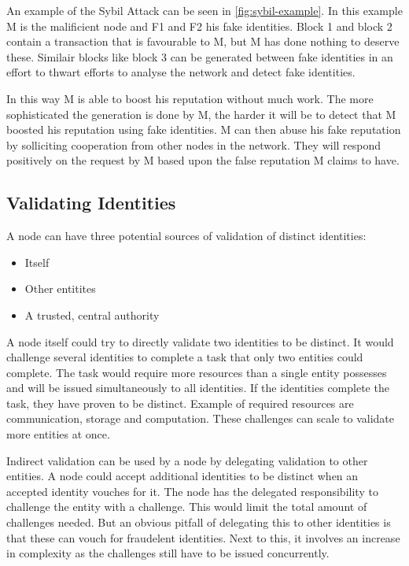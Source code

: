 An example of the Sybil Attack can be seen in \ref{fig:sybil-example}.
In this example M is the malificient node and F1 and F2 his fake identities.
Block 1 and block 2 contain a transaction that is favourable to M,
but M has done nothing to deserve these.
Similair blocks like block 3 can be generated between fake identities in an effort to thwart efforts to analyse the network
and detect fake identities.

In this way M is able to boost his reputation without much work.
The more sophisticated the generation is done by M,
the harder it will be to detect that M boosted his reputation using fake identities.
M can then abuse his fake reputation by solliciting cooperation from other nodes in the network.
They will respond positively on the request by M based upon the false reputation M claims to have.

\subsection{Validating Identities}
A node can have three potential sources of validation of distinct identities:
\begin{itemize}
\item Itself
\item Other entitites
\item A trusted, central authority
\end{itemize}

A node itself could try to directly validate two identities to be distinct.
It would challenge several identities to complete a task that only two entities could complete.
The task would require more resources than a single entity possesses and will be issued simultaneously to all identities.
If the identities complete the task, they have proven to be distinct.
Example of required resources are communication, storage and computation.
These challenges can scale to validate more entities at once.

Indirect validation can be used by a node by delegating validation to other entities.
A node could accept additional identities to be distinct when an accepted identity vouches for it.
The node has the delegated responsibility to challenge the entity with a challenge.
This would limit the total amount of challenges needed.
But an obvious pitfall of delegating this to other identities is that these can vouch for fraudelent identities.
Next to this, it involves an increase in complexity as the challenges still have to be issued concurrently.

